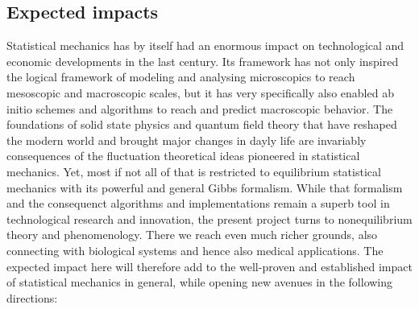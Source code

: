\subsection{Expected impacts}

Statistical mechanics has by itself had an enormous impact on technological and economic developments in the last century.  Its framework has not only inspired the logical framework of modeling and analysing microscopics to reach mesoscopic and macroscopic scales, but it has very specifically also enabled ab initio schemes and algorithms to reach and predict macroscopic behavior.  The foundations of solid state physics and quantum field theory that have reshaped the modern world and brought major changes in dayly life are invariably consequences of the fluctuation theoretical ideas pioneered in statistical mechanics.  Yet, most if not all of that is restricted to equilibrium statistical mechanics with its powerful and general Gibbs formalism.  While that formalism and the consequenct algorithms and implementations remain a superb tool in technological research and innovation, the present project turns to nonequilibrium theory and phenomenology.  There we reach even much richer grounds, also connecting with biological systems and hence also medical applications.  The expected impact here will therefore add to the well-proven and established impact of statistical mechanics in general, while opening new avenues in the following directions:

